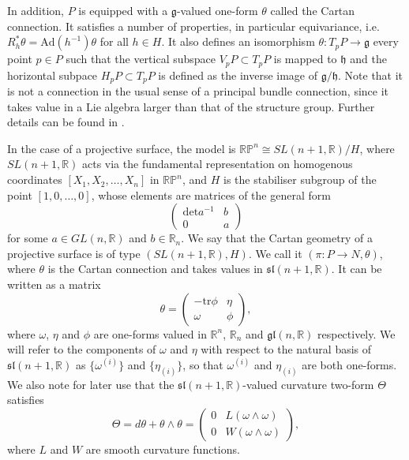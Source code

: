 In addition, $P$ is equipped with a $\mathfrak{g}$-valued one-form
$\theta$ called the Cartan connection. It satisfies a number of properties,
in particular equivariance, i.e. $R_{h}^{*}\theta=\mathrm{Ad}(h^{-1})\theta$
for all $h\in H$. It also defines an isomorphism $\theta:T_{p}P\rightarrow\mathfrak{g}$
every point $p\in P$ such that the vertical subspace $V_{p}P\subset T_{p}P$
is mapped to $\mathfrak{h}$ and the horizontal subpace $H_{p}P\subset T_{p}P$
is defined as the inverse image of $\mathfrak{g}/\mathfrak{h}$. Note
that it is not a connection in the usual sense of a principal bundle
connection, since it takes value in a Lie algebra larger than that
of the structure group. Further details can be found in \cite{Sharpe1997}.

In the case of a projective surface, the model is $\mathbb{RP}^{n}\cong SL(n+1,\mathbb{R})/H$,
where $SL(n+1,\mathbb{R})$ acts via the fundamental representation
on homogenous coordinates $[X_1,X_2,\dots,X_n]$ in $\mathbb{RP}^{n}$, and $H$
is the stabiliser subgroup of the point $[1,0,\dots,0]$, whose elements
are matrices of the general form
\[
\begin{pmatrix}\mathrm{det}a^{-1} & b\\
0 & a
\end{pmatrix}
\]
for some $a\in GL(n,\mathbb{R})$ and $b\in\mathbb{R}_{n}$. We say
that the Cartan geometry of a projective surface is of type $(SL(n+1,\mathbb{R}),H)$.
We call it $(\pi:P\rightarrow N,\theta)$, where $\theta$ is the
Cartan connection and takes values in $\mathfrak{sl}(n+1,\mathbb{R})$.
It can be written as a matrix
\[
\theta=\begin{pmatrix}-\mathrm{tr}\phi & \eta\\
\omega & \phi
\end{pmatrix},
\]
where $\omega$, $\eta$ and $\phi$ are one-forms valued in $\mathbb{R}^{n}$,
$\mathbb{R}_{n}$ and $\mathfrak{gl}(n,\mathbb{R})$ respectively.
We will refer to the components of $\omega$ and $\eta$ with respect
to the natural basis of $\mathfrak{sl}(n+1,\mathbb{R})$ as $\{\omega^{(i)}\}$
and $\{\eta_{(i)}\}$, so that $\omega^{(i)}$ and $\eta_{(i)}$ are
both one-forms. We also note for later use that the $\mathfrak{sl}(n+1,\mathbb{R})$-valued
curvature two-form $\Theta$ satisfies
\[
\Theta=d\theta+\theta\wedge\theta=\begin{pmatrix}0 & L(\omega\wedge\omega)\\
0 & W(\omega\wedge\omega)
\end{pmatrix},
\]
where $L$ and $W$ are smooth curvature functions.


